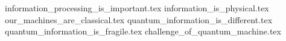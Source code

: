 {information_processing_is_important.tex}
{information_is_physical.tex}
{our_machines_are_classical.tex}
{quantum_information_is_different.tex}
{quantum_information_is_fragile.tex}
{challenge_of_quantum_machine.tex}
